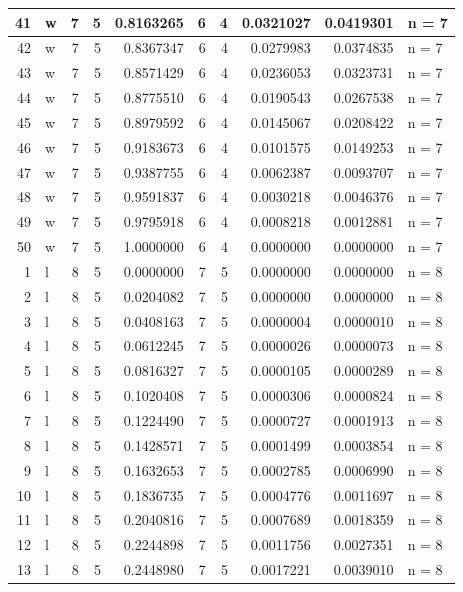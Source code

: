 \documentclass[
  letterpaper,
  DIV=11,
  numbers=noendperiod]{scrreprt}
\begin{document}
\begin{table}
\begin{tabular}[t]{r|l|r|r|r|r|r|r|r|l}
\hline
41 & w & 7 & 5 & 0.8163265 & 6 & 4 & 0.0321027 & 0.0419301 & n = 7\\
\hline
42 & w & 7 & 5 & 0.8367347 & 6 & 4 & 0.0279983 & 0.0374835 & n = 7\\
\hline
43 & w & 7 & 5 & 0.8571429 & 6 & 4 & 0.0236053 & 0.0323731 & n = 7\\
\hline
44 & w & 7 & 5 & 0.8775510 & 6 & 4 & 0.0190543 & 0.0267538 & n = 7\\
\hline
45 & w & 7 & 5 & 0.8979592 & 6 & 4 & 0.0145067 & 0.0208422 & n = 7\\
\hline
46 & w & 7 & 5 & 0.9183673 & 6 & 4 & 0.0101575 & 0.0149253 & n = 7\\
\hline
47 & w & 7 & 5 & 0.9387755 & 6 & 4 & 0.0062387 & 0.0093707 & n = 7\\
\hline
48 & w & 7 & 5 & 0.9591837 & 6 & 4 & 0.0030218 & 0.0046376 & n = 7\\
\hline
49 & w & 7 & 5 & 0.9795918 & 6 & 4 & 0.0008218 & 0.0012881 & n = 7\\
\hline
50 & w & 7 & 5 & 1.0000000 & 6 & 4 & 0.0000000 & 0.0000000 & n = 7\\
\hline
1 & l & 8 & 5 & 0.0000000 & 7 & 5 & 0.0000000 & 0.0000000 & n = 8\\
\hline
2 & l & 8 & 5 & 0.0204082 & 7 & 5 & 0.0000000 & 0.0000000 & n = 8\\
\hline
3 & l & 8 & 5 & 0.0408163 & 7 & 5 & 0.0000004 & 0.0000010 & n = 8\\
\hline
4 & l & 8 & 5 & 0.0612245 & 7 & 5 & 0.0000026 & 0.0000073 & n = 8\\
\hline
5 & l & 8 & 5 & 0.0816327 & 7 & 5 & 0.0000105 & 0.0000289 & n = 8\\
\hline
6 & l & 8 & 5 & 0.1020408 & 7 & 5 & 0.0000306 & 0.0000824 & n = 8\\
\hline
7 & l & 8 & 5 & 0.1224490 & 7 & 5 & 0.0000727 & 0.0001913 & n = 8\\
\hline
8 & l & 8 & 5 & 0.1428571 & 7 & 5 & 0.0001499 & 0.0003854 & n = 8\\
\hline
9 & l & 8 & 5 & 0.1632653 & 7 & 5 & 0.0002785 & 0.0006990 & n = 8\\
\hline
10 & l & 8 & 5 & 0.1836735 & 7 & 5 & 0.0004776 & 0.0011697 & n = 8\\
\hline
11 & l & 8 & 5 & 0.2040816 & 7 & 5 & 0.0007689 & 0.0018359 & n = 8\\
\hline
12 & l & 8 & 5 & 0.2244898 & 7 & 5 & 0.0011756 & 0.0027351 & n = 8\\
\hline
13 & l & 8 & 5 & 0.2448980 & 7 & 5 & 0.0017221 & 0.0039010 & n = 8\\

\end{tabular}
\end{table}
\end{document}
